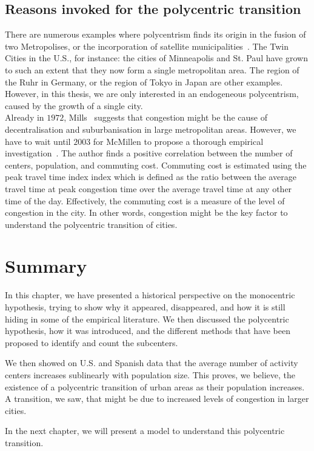 \subsection{Reasons invoked for the polycentric transition}
\label{sec:reasons_invoked_for_the_polycentric_transition}

There are numerous examples where polycentrism finds its origin in the fusion of
two Metropolises, or the incorporation of satellite
municipalities~\cite{LeNechet:2015}. The Twin Cities in the U.S., for instance:
the cities of Minneapolis and St. Paul have grown to such an extent that they now
form a single metropolitan area. The region of the Ruhr in Germany, or the
region of Tokyo in Japan are other examples. However, in this thesis, we are only interested in
an endogeneous polycentrism, caused by the growth of a single city.\\

Already in $1972$, Mills~\cite{Mills:1972} suggests that congestion might be the
cause of decentralisation and suburbanisation in large metropolitan areas.
However, we have to wait until $2003$ for McMillen to propose a thorough
empirical investigation~\cite{McMillen:2003}. The author finds a positive
correlation between the number of centers, population, and commuting cost.
Commuting cost is estimated using the peak travel time index index which is
defined as the ratio between the average travel time at peak congestion time
over the average travel time at any other time of the day. Effectively, the
commuting cost is a measure of the level of congestion in the city. In other
words, congestion might be the key factor to understand the polycentric
transition of cities.



\section{Summary}
\label{sec:summary}

In this chapter, we have presented a historical perspective on the monocentric
hypothesis, trying to show why it appeared, disappeared, and how it is still hiding in 
some of the empirical literature. We then discussed the polycentric hypothesis,
how it was introduced, and the different methods that have been proposed to
identify and count the subcenters.

We then showed on U.S. and Spanish data that the average number of
activity centers increases sublinearly with population size. This
proves, we believe, the existence of a polycentric transition of urban areas as
their population increases. A transition, we saw, that might be due to increased levels
of congestion in larger cities.

In the next chapter, we will present a model to understand this polycentric
transition. 
